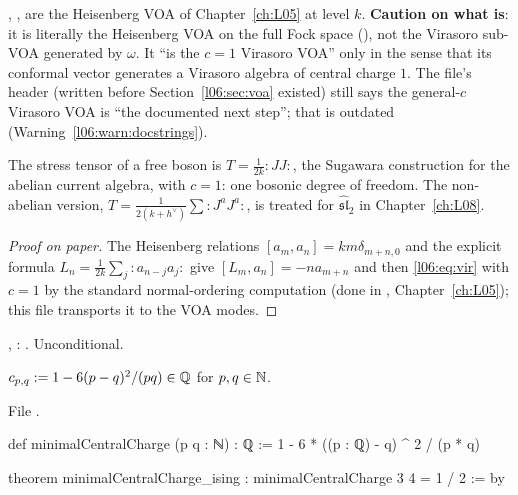 \begin{dictionary}
, ,  are the Heisenberg VOA of Chapter~\ref{ch:L05} at level
$k$. \textbf{Caution on what  is}: it is literally the Heisenberg VOA on the full Fock
space (\allowbreak{}\allowbreak{}), not the Virasoro sub-VOA generated by $\omega$. It ``is the
$c = 1$ Virasoro VOA'' only in the sense that its conformal vector generates a Virasoro algebra of central
charge $1$. The file's header (written before Section~\ref{l06:sec:voa} existed) still says the general-$c$
Virasoro VOA is ``the documented next step''; that is outdated (Warning~\ref{l06:warn:docstrings}).
\end{dictionary}

\begin{physics}
The stress tensor of a free boson is $T = \frac1{2k}{:}JJ{:}$, the Sugawara construction for the abelian
current algebra, with $c = 1$: one bosonic degree of freedom. The non-abelian version,
$T = \frac{1}{2(k+h^\vee)}\sum{:}J^aJ^a{:}$, is treated for $\widehat{\mathfrak{sl}}_2$ in Chapter~\ref{ch:L08}.
\end{physics}

\begin{proof}[Proof on paper]
The Heisenberg relations $[a_m,a_n] = km\delta_{m+n,0}$ and the explicit formula
$L_n = \frac1{2k}\sum_j{:}a_{n-j}a_j{:}$ give $[L_m,a_n] = -na_{m+n}$ and then \eqref{l06:eq:vir} with
$c = 1$ by the standard normal-ordering computation (done in ,
Chapter~\ref{ch:L05}); this file transports it to the VOA modes.
\end{proof}

\begin{status}
\allowbreak{}\allowbreak{}\allowbreak{}\allowbreak{}, : \lean{[propext, Classical.}\allowbreak{}\allowbreak\lean{sound]}. Unconditional.
\end{status}

\begin{definition}\label{l06:def:cpq}
$c_{p,q} := 1-6(p-q)^2/(pq)\in{\mathbb{Q}}$ for $p,q\in{\mathbb{N}}$.
\end{definition}

File .
\begin{leancode}
def minimalCentralCharge (p q : ℕ) : ℚ := 1 - 6 * ((p : ℚ) - q) ^ 2 / (p * q)

theorem minimalCentralCharge_ising : minimalCentralCharge 3 4 = 1 / 2 := by
\end{leancode}

